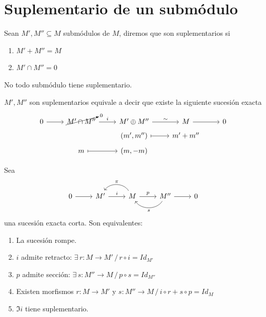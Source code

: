 \section{Suplementario de un subm\'odulo}
\begin{defi}Sean $M', M'' \subseteq M$ subm\'odulos de $M$, diremos que son suplementarios si \begin{enumerate}[1)]
    \item $M' + M'' = M$
    \item $M' \cap M'' = 0$
\end{enumerate}
\end{defi}
\begin{obs}
    No todo subm\'odulo tiene suplementario.
\end{obs}
\begin{prop}
    $M', M''$ son suplementarios equivale a decir que existe la siguiente sucesi\'on exacta  $$\bt 0 \arrow{r} & \cancelto{0}{M'\cap M''} \arrow{r}{i} & M' \oplus M'' \arrow{r}{\sim} & M \arrow{r} & 0 \\[-5mm]
    & & (m',m'' ) \arrow[mapsto]{r} & m'+m'' \\[-5mm]
    & m \arrow[mapsto]{r} & (m, -m) 
    \et$$
\end{prop}
\begin{prop}
    Sea  $$\bt 0 \arrow{r} &  M' \arrow{r}{i} & \arrow[bend right=20mm, swap]{l}{\pi} M \arrow{r}{p} & \arrow[bend left = 20mm]{l}{s} M''  \arrow{r} & 0 \et $$
    una sucesi\'on exacta corta. Son equivalentes:
    \begin{enumerate}[1)]
        \item La sucesi\'on rompe.
        \item $i$ admite retracto: $\exists \, r : M \longrightarrow M' \, / \, r \circ i = Id_{M'}$
        \item $p$ admite secci\'on: $\exists \, s : M'' \longrightarrow M \, / \, p \circ s = Id_{M''}$
        \item Existen morfismos $r: M \longrightarrow M'$ y $s: M'' \longrightarrow M \, / \, i \circ r + s\circ p = Id_M$
        \item $\Im i $ tiene suplementario.
    \end{enumerate}
\end{prop}
